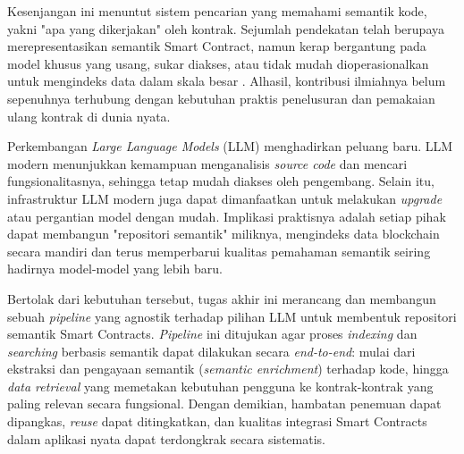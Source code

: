 Kesenjangan ini menuntut sistem pencarian yang memahami semantik kode, yakni "apa yang dikerjakan" oleh kontrak. Sejumlah pendekatan telah berupaya merepresentasikan semantik Smart Contract, namun kerap bergantung pada model khusus yang usang, sukar diakses, atau tidak mudah dioperasionalkan untuk mengindeks data dalam skala besar \parencite{zhang2021smart} \parencite{stan} \parencite{zheng2020overview} \parencite{shi2021semantic}. Alhasil, kontribusi ilmiahnya belum sepenuhnya terhubung dengan kebutuhan praktis penelusuran dan pemakaian ulang kontrak di dunia nyata.

Perkembangan \textit{Large Language Models} (LLM) menghadirkan peluang baru. LLM modern menunjukkan kemampuan menganalisis \textit{source code} dan mencari fungsionalitasnya, sehingga tetap mudah diakses oleh pengembang. Selain itu, infrastruktur LLM modern juga dapat dimanfaatkan untuk melakukan \textit{upgrade} atau pergantian model dengan mudah. Implikasi praktisnya adalah setiap pihak dapat membangun "repositori semantik" miliknya, mengindeks data blockchain secara mandiri dan terus memperbarui kualitas pemahaman semantik seiring hadirnya model-model yang lebih baru.

Bertolak dari kebutuhan tersebut, tugas akhir ini merancang dan membangun sebuah \textit{pipeline} yang agnostik terhadap pilihan LLM untuk membentuk repositori semantik Smart Contracts. \textit{Pipeline} ini ditujukan agar proses \textit{indexing} dan \textit{searching} berbasis semantik dapat dilakukan secara \textit{end-to-end}: mulai dari ekstraksi dan pengayaan semantik (\textit{semantic enrichment}) terhadap kode, hingga \textit{data retrieval} yang memetakan kebutuhan pengguna ke kontrak-kontrak yang paling relevan secara fungsional. Dengan demikian, hambatan penemuan dapat dipangkas, \textit{reuse} dapat ditingkatkan, dan kualitas integrasi Smart Contracts dalam aplikasi nyata dapat terdongkrak secara sistematis.